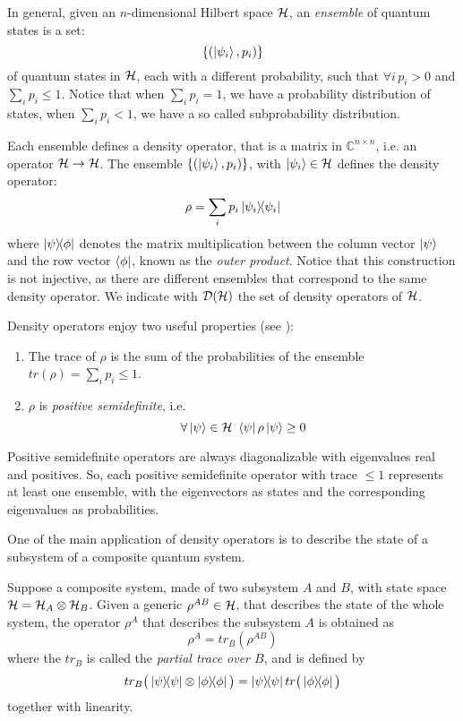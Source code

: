 In general, given an $n$-dimensional Hilbert space $\mathcal{H}$, an \textit{ensemble} of quantum states is a set:
\[\{(\ket{\psi_i}, p_i)\} \]
of quantum states in $\mathcal{H}$, each with a different probability, such that $\forall i \, p_i > 0$ and $\sum_i p_i \leq 1$. Notice that when $\sum_i p_i = 1$, we have a probability distribution of states, when $\sum_i p_i < 1$, we have a so called subprobability distribution.

Each ensemble defines a density operator, that is a matrix in $\mathbb{C}^{n \times n}$, i.e. an operator $\mathcal{H} \rightarrow \mathcal{H}$. The ensemble $\{(\ket{\psi_i}, p_i)\}$, with $\ket{\psi_i} \in \mathcal{H}$ defines the density operator: 
\[
	\rho = \sum_i p_i \ket{\psi_i}\!\!\bra{\psi_i}
\]
where $\ket{\psi}\!\!\bra{\phi}$ denotes the matrix multiplication between the column vector $\ket{\psi}$ and the row vector $\bra{\phi}$, known as the \textit{outer product}. Notice that this construction is not injective, as there are different ensembles that correspond to the same density operator. We indicate with $\mathcal{D}(\mathcal{H})$ the set of density operators of $\mathcal{H}$.

Density operators enjoy two useful properties (see \cite{nielsen_chuang_2010}): \begin{enumerate}
\item The trace of $\rho$ is the sum of the probabilities of the ensemble $tr(\rho) = \sum_i p_i \leq 1$.
\item $\rho$ is \textit{positive semidefinite}, i.e. 
\[\forall \ket{\psi} \in \mathcal{H} \ \bra{\psi}\rho\ket{\psi} \geq 0\]
\end{enumerate}

Positive semidefinite operators are always diagonalizable with eigenvalues real and positives. So, each positive semidefinite operator with trace $\leq 1$ represents at least one ensemble, with the eigenvectors as states and the corresponding eigenvalues as probabilities.


One of the main application of density operators is to describe the state of a subsystem of a composite quantum system.

Suppose a composite system, made of two subsystem $A$ and $B$, with state space  $\mathcal{H} = \mathcal{H}_A \otimes \mathcal{H}_B$.  Given a generic $\rho^{AB} \in \mathcal{H}$, that describes the state of the whole system, the operator $\rho^A$ that describes the subsystem $A$ is obtained as 
\[
	\rho^A = tr_B(\rho^{AB})
\]
where the $tr_B$ is called the \textit{partial trace over $B$}, and is defined by 
\[
 tr_B\big(\proj{\psi} \otimes \proj{\phi}\big) = \proj{\psi}tr\big(\proj{\phi}\big)
\]
together with linearity.

